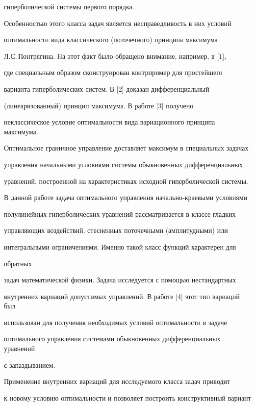 гиперболической системы первого порядка.





Особенностью этого класса задач является несправедливость в них условий


оптимальности вида классического (поточечного) принципа максимума


Л.С.\,Понтрягина. На этот факт было обращено внимание, например, в [1],


где специальным образом сконструирован контрпример для простейшего


варианта гиперболических систем. В [2] доказан дифференциальный


(линеаризованный) принцип максимума. В работе [3] получено


неклассическое условие оптимальности вида вариационного принципа максимума.


Оптимальное граничное управление доставляет максимум в специальных задачах


управления начальными условиями системы обыкновенных дифференциальных 


уравнений, построенной на характеристиках исходной гиперболической системы. 





В данной работе задача оптимального управления начально-краевыми условиями


полулинейных гиперболических уравнений рассматривается в классе гладких


управляющих воздействий, стесненных поточечными (амплитудными) или


интегральными ограничениями. Именно такой класс функций характерен для


обратных 


задач математической физики. Задача исследуется с помощью нестандартных


внутренних вариаций допустимых управлений. В работе [4] этот тип вариаций был


использован для получения необходимых условий оптимальности в задаче


оптимального управления системами обыкновенных дифференциальных уравнений


с запаздыванием. 





Применение внутренних вариаций для исследуемого класса задач приводит


к новому условию оптимальности и позволяет построить конструктивный вариант


